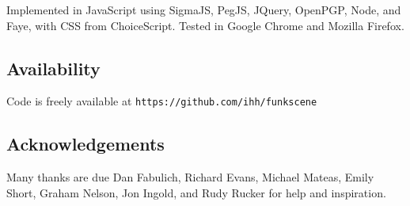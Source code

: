 \documentclass{acm_proc_article-sp}
\begin{document}
Implemented in JavaScript
using SigmaJS, PegJS, JQuery, OpenPGP, Node, and Faye,
with CSS from ChoiceScript.
Tested in Google Chrome and Mozilla Firefox.



\subsection{Availability}

Code is freely available at
{\tt https://github.com/ihh/funkscene}


\subsection{Acknowledgements}

Many thanks are due Dan Fabulich, Richard Evans, Michael Mateas, Emily Short, Graham Nelson, Jon Ingold,
and Rudy Rucker for help and inspiration.




\balancecolumns
\end{document}

